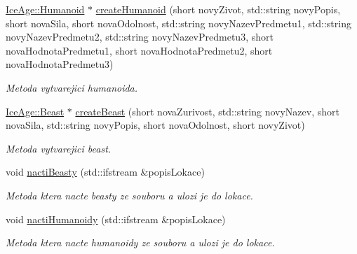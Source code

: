 \begin{DoxyCompactItemize}
\hyperlink{classIceAge_1_1Humanoid}{Ice\+Age\+::\+Humanoid} $\ast$ \hyperlink{classIceAge_1_1BuilderLokace_abff6ab9c1d0218adfe423f45c8186090}{create\+Humanoid} (short novy\+Zivot, std\+::string novy\+Popis, short nova\+Sila, short nova\+Odolnost, std\+::string novy\+Nazev\+Predmetu1, std\+::string novy\+Nazev\+Predmetu2, std\+::string novy\+Nazev\+Predmetu3, short nova\+Hodnota\+Predmetu1, short nova\+Hodnota\+Predmetu2, short nova\+Hodnota\+Predmetu3)
\begin{DoxyCompactList}\small\item\em Metoda vytvarejici humanoida. \end{DoxyCompactList}\item 
\hyperlink{classIceAge_1_1Beast}{Ice\+Age\+::\+Beast} $\ast$ \hyperlink{classIceAge_1_1BuilderLokace_a6ce9f158876a0601a3bac0cc26ed2d46}{create\+Beast} (short nova\+Zurivost, std\+::string novy\+Nazev, short nova\+Sila, std\+::string novy\+Popis, short nova\+Odolnost, short novy\+Zivot)
\begin{DoxyCompactList}\small\item\em Metoda vytvarejici beast. \end{DoxyCompactList}\item 
void \hyperlink{classIceAge_1_1BuilderLokace_a8424c61902a53f9304460055f478601b}{nacti\+Beasty} (std\+::ifstream \&popis\+Lokace)
\begin{DoxyCompactList}\small\item\em Metoda ktera nacte beasty ze souboru a ulozi je do lokace. \end{DoxyCompactList}\item 
void \hyperlink{classIceAge_1_1BuilderLokace_a98fae825f3de1d12408a85f03d98f2fd}{nacti\+Humanoidy} (std\+::ifstream \&popis\+Lokace)
\begin{DoxyCompactList}\small\item\em Metoda ktera nacte humanoidy ze souboru a ulozi je do lokace. \end{DoxyCompactList}\end{DoxyCompactItemize}
